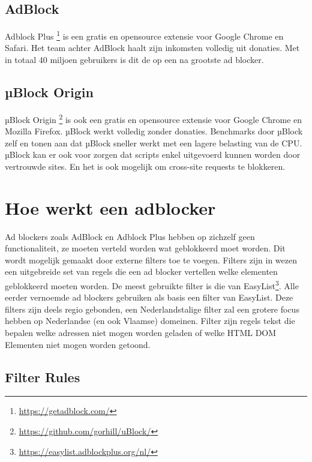 \documentclass[pdftex,a4paper,12pt,twoside]{report}
\begin{document}
\section{AdBlock}
\label{sec:AdBlock}
Adblock Plus \footnote{\url{https://getadblock.com/}} is een gratis en opensource extensie voor Google Chrome en Safari. Het team achter AdBlock haalt zijn inkomsten volledig uit donaties. Met in totaal 40 miljoen gebruikers is dit de op een na grootste ad blocker.

\section{µBlock Origin}
\label{sec:uBlock Origin}%
µBlock Origin \footnote{\url{https://github.com/gorhill/uBlock/}} is ook een gratis en opensource extensie voor Google Chrome en Mozilla Firefox. µBlock werkt volledig zonder donaties. Benchmarks door µBlock zelf en \citep{PerformanceAB} tonen aan dat µBlock sneller werkt met een lagere belasting van de CPU. µBlock kan er ook voor zorgen dat scripts enkel uitgevoerd kunnen worden door vertrouwde sites. En het is ook mogelijk om \glspl{cross-site request} te blokkeren.



\chapter{Hoe werkt een adblocker}
\label{ch:Hoe werkt een adblocker}
Ad blockers zoals AdBlock en Adblock Plus hebben op zichzelf geen functionaliteit, ze moeten verteld worden wat geblokkeerd moet worden. Dit wordt mogelijk gemaakt door externe filters toe te voegen. Filters zijn in wezen een uitgebreide set van regels die een ad blocker vertellen welke elementen geblokkeerd moeten worden. De meest gebruikte filter is die van EasyList\footnote{\url{https://easylist.adblockplus.org/nl/}}. Alle eerder vernoemde ad blockers gebruiken als basis een filter van EasyList. Deze filters zijn deels regio gebonden, een Nederlandstalige filter zal een grotere focus hebben op Nederlandse (en ook Vlaamse) domeinen. Filter zijn regels tekst die bepalen welke adressen niet mogen worden geladen of welke HTML DOM Elementen niet mogen worden getoond.

\section{Filter Rules}
\label{sec:Filter Rules}
\end{document}
